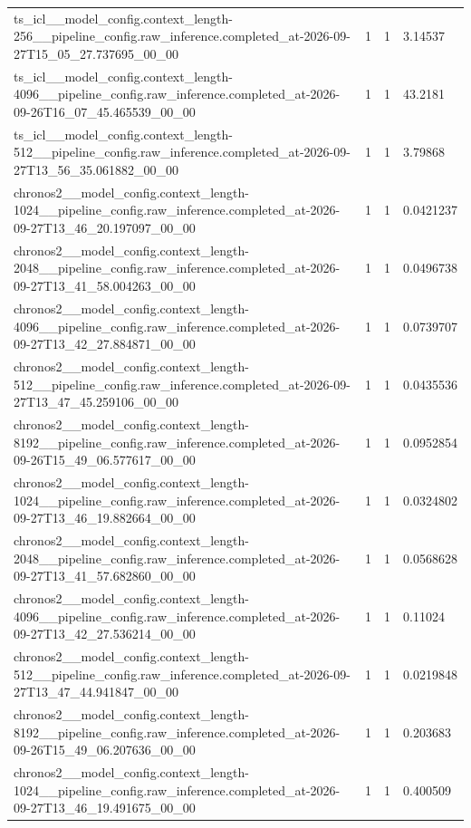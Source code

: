 \begin{tabular}{llll}
ts\_icl\_\_model\_config.context\_length-256\_\_pipeline\_config.raw\_inference.completed\_at-2026-09-27T15\_05\_27.737695\_00\_00 & 1 & 1 & 3.14537 \\
ts\_icl\_\_model\_config.context\_length-4096\_\_pipeline\_config.raw\_inference.completed\_at-2026-09-26T16\_07\_45.465539\_00\_00 & 1 & 1 & 43.2181 \\
ts\_icl\_\_model\_config.context\_length-512\_\_pipeline\_config.raw\_inference.completed\_at-2026-09-27T13\_56\_35.061882\_00\_00 & 1 & 1 & 3.79868 \\
chronos2\_\_model\_config.context\_length-1024\_\_pipeline\_config.raw\_inference.completed\_at-2026-09-27T13\_46\_20.197097\_00\_00 & 1 & 1 & 0.0421237 \\
chronos2\_\_model\_config.context\_length-2048\_\_pipeline\_config.raw\_inference.completed\_at-2026-09-27T13\_41\_58.004263\_00\_00 & 1 & 1 & 0.0496738 \\
chronos2\_\_model\_config.context\_length-4096\_\_pipeline\_config.raw\_inference.completed\_at-2026-09-27T13\_42\_27.884871\_00\_00 & 1 & 1 & 0.0739707 \\
chronos2\_\_model\_config.context\_length-512\_\_pipeline\_config.raw\_inference.completed\_at-2026-09-27T13\_47\_45.259106\_00\_00 & 1 & 1 & 0.0435536 \\
chronos2\_\_model\_config.context\_length-8192\_\_pipeline\_config.raw\_inference.completed\_at-2026-09-26T15\_49\_06.577617\_00\_00 & 1 & 1 & 0.0952854 \\
chronos2\_\_model\_config.context\_length-1024\_\_pipeline\_config.raw\_inference.completed\_at-2026-09-27T13\_46\_19.882664\_00\_00 & 1 & 1 & 0.0324802 \\
chronos2\_\_model\_config.context\_length-2048\_\_pipeline\_config.raw\_inference.completed\_at-2026-09-27T13\_41\_57.682860\_00\_00 & 1 & 1 & 0.0568628 \\
chronos2\_\_model\_config.context\_length-4096\_\_pipeline\_config.raw\_inference.completed\_at-2026-09-27T13\_42\_27.536214\_00\_00 & 1 & 1 & 0.11024 \\
chronos2\_\_model\_config.context\_length-512\_\_pipeline\_config.raw\_inference.completed\_at-2026-09-27T13\_47\_44.941847\_00\_00 & 1 & 1 & 0.0219848 \\
chronos2\_\_model\_config.context\_length-8192\_\_pipeline\_config.raw\_inference.completed\_at-2026-09-26T15\_49\_06.207636\_00\_00 & 1 & 1 & 0.203683 \\
chronos2\_\_model\_config.context\_length-1024\_\_pipeline\_config.raw\_inference.completed\_at-2026-09-27T13\_46\_19.491675\_00\_00 & 1 & 1 & 0.400509 \\

\end{tabular}
